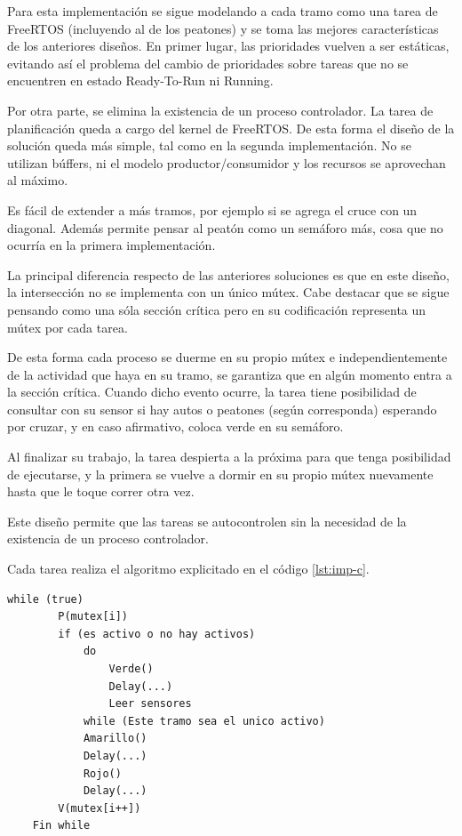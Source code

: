 Para esta implementación se sigue modelando a cada tramo como una tarea de FreeRTOS (incluyendo al de los peatones) y se toma las mejores características de los anteriores diseños.
En primer lugar, las prioridades vuelven a ser estáticas, evitando así el problema del cambio de prioridades sobre tareas que no se encuentren en estado Ready-To-Run ni Running.

Por otra parte, se elimina la existencia de un proceso controlador.
La tarea de planificación queda a cargo del kernel de FreeRTOS.
De esta forma el diseño de la solución queda más simple, tal como en la segunda implementación.
No se utilizan búffers, ni el modelo productor/consumidor y los recursos se aprovechan al máximo.

Es fácil de extender a más tramos, por ejemplo si se agrega el cruce con un diagonal.
Además permite pensar al peatón como un semáforo más, cosa que no ocurría en la primera implementación.

La principal diferencia respecto de las anteriores soluciones es que en este diseño, la intersección no se implementa con un único mútex.
Cabe destacar que se sigue pensando como una sóla sección crítica pero en su codificación representa un mútex por cada tarea.

De esta forma cada proceso se duerme en su propio mútex e independientemente de la actividad que haya en su tramo, se garantiza que en algún momento entra a la sección crítica.
Cuando dicho evento ocurre, la tarea tiene posibilidad de consultar con su sensor si hay autos o peatones (según corresponda) esperando por cruzar, y en caso afirmativo, coloca verde en su semáforo.

Al finalizar su trabajo, la tarea despierta a la próxima para que tenga posibilidad de ejecutarse, y la primera se vuelve a dormir en su propio mútex nuevamente hasta que le toque correr otra vez.

Este diseño permite que las tareas se autocontrolen sin la necesidad de la existencia de un proceso controlador.

Cada tarea realiza el algoritmo explicitado en el código \ref{lst:imp-c}.

\begin{lstlisting}[label=lst:imp-c, caption=Pseudocódigo del programa que corre cada tarea en la implementación C.]
	while (true)
		P(mutex[i])
		if (es activo o no hay activos)
			do
				Verde()
				Delay(...)
				Leer sensores
			while (Este tramo sea el unico activo)
			Amarillo()
			Delay(...)
			Rojo()
			Delay(...)
		V(mutex[i++])
	Fin while
\end{lstlisting}
